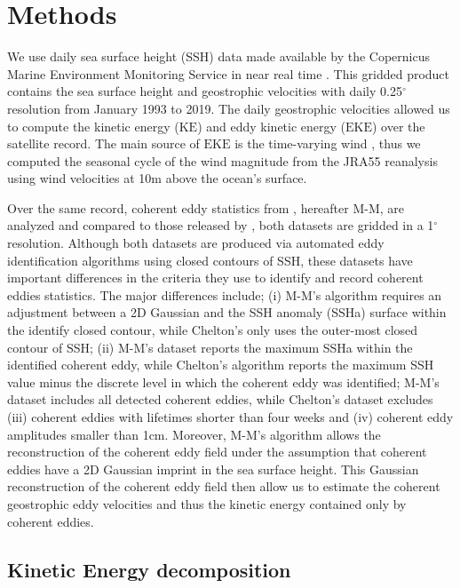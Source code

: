 \documentclass[draft,linenumbers]{agujournal2019}
\newcommand{\KE}{\textrm{KE}}
\newcommand{\EKE}{\textrm{EKE}}
\begin{document}
\section{Methods}
\label{sec:Methods}
	We use daily sea surface height (SSH) data made available by the Copernicus Marine Environment Monitoring Service in near real time \citep{CMEMS_aviso_2017}. 
	This gridded product contains the sea surface height and geostrophic velocities with daily 0.25$^\circ$ resolution from January 1993 to 2019.
	The daily geostrophic velocities allowed us to compute the kinetic energy ($\KE$) and eddy kinetic energy ($\EKE$) over the satellite record. The main source of $\EKE$ is the time-varying wind \citep{Ferrari_energy_2009}, thus we computed the seasonal cycle of the wind magnitude from the JRA55 reanalysis \citep{JMA_JRA55_2013} using wind velocities at 10m above the ocean's surface. 

	Over the same record, coherent eddy statistics from \citet{Martinez_TKE_2019}, hereafter M-M, are analyzed and compared to those released by \citet{Chelton_mesoscale_2013}, both datasets are gridded in a 1$^\circ$ resolution. 
	Although both datasets are produced via automated eddy identification algorithms using closed contours of SSH, these datasets have important differences in the criteria they use to identify and record coherent eddies statistics. 
	The major differences include; (i) M-M's algorithm requires an adjustment between a 2D Gaussian and the SSH anomaly (SSHa) surface within the identify closed contour, while Chelton's only uses the outer-most closed contour of SSH; (ii) M-M's dataset reports the maximum SSHa within the identified coherent eddy, while Chelton's algorithm reports the maximum SSH value minus the discrete level in which the coherent eddy was identified; M-M's dataset includes all detected coherent eddies, while Chelton's dataset excludes (iii) coherent eddies with lifetimes shorter than four weeks and (iv) coherent eddy amplitudes smaller than 1cm. Moreover, M-M's algorithm allows the reconstruction of the coherent eddy field under the assumption that coherent eddies have a 2D Gaussian imprint in the sea surface height. This Gaussian reconstruction of the coherent eddy field  then allow us to estimate the coherent geostrophic eddy velocities and thus the kinetic energy contained only by coherent eddies.

	\subsection{Kinetic Energy decomposition}
\end{document}
